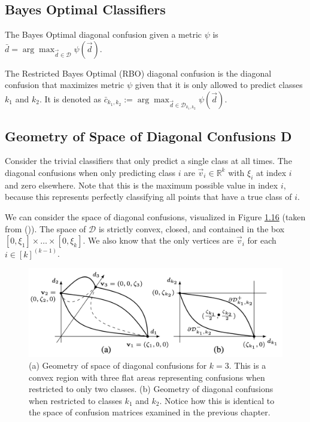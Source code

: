 \documentclass[
  letterpaper,
  DIV=11,
  numbers=noendperiod,
  oneside]{scrreprt}
\theoremstyle{remark}
\begin{document}
\subsection{Bayes Optimal Classifiers}\label{bayes-optimal-classifiers}

The Bayes Optimal diagonal confusion given a metric \(\psi\) is
\(\bar{d} = \arg\max_{\vec{d} \in \mathcal{D}} \psi(\vec{d})\).

The Restricted Bayes Optimal (RBO) diagonal confusion is the diagonal
confusion that maximizes metric \(\psi\) given that it is only allowed
to predict classes \(k_1\) and \(k_2\). It is denoted as
\(\bar{c}_{k_1, k_2} := \arg\max_{\vec{d} \in \mathcal{D}_{k_1, k_2}} \psi(\vec{d})\).

\subsection{Geometry of Space of Diagonal Confusions
D}\label{geometry-of-space-of-diagonal-confusions-d}

Consider the trivial classifiers that only predict a single class at all
times. The diagonal confusions when only predicting class \(i\) are
\(\vec{v}_i \in \mathbb{R}^k\) with \(\xi_i\) at index \(i\) and zero
elsewhere. Note that this is the maximum possible value in index \(i\),
because this represents perfectly classifying all points that have a
true class of \(i\).

We can consider the space of diagonal confusions, visualized in Figure
\hyperref[diag_geom]{1.16} (taken from
()). The
space of \(\mathcal{D}\) is strictly convex, closed, and contained in
the box \([0, \xi_1] \times \dots \times [0, \xi_k]\). We also know that
the only vertices are \(\vec{v}_i\) for each \(i \in [k]^{(k-1)}\).

\begin{figure}

{\centering \includegraphics{Figures/diag_geometry.png}

}

\caption{(a) Geometry of space of diagonal confusions for \(k=3\). This
is a convex region with three flat areas representing confusions when
restricted to only two classes. (b) Geometry of diagonal confusions when
restricted to classes \(k_1\) and \(k_2\). Notice how this is identical
to the space of confusion matrices examined in the previous chapter.}

\end{figure}%
\end{document}
